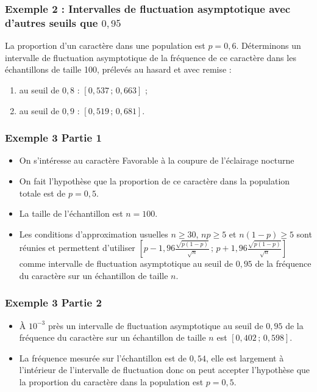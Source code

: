 \documentclass[xcolor=svgnames,t,final]{beamer}
\newcommand{\Interff}[2]{\left[#1\, ;\, #2\right]}
\begin{document}
\begin{frame}

\frametitle{Exemple 2 : Intervalles de fluctuation  asymptotique avec d'autres seuils que $0,95$}

La proportion d'un caractère dans une population  est $p=0,6$. Déterminons un intervalle de fluctuation asymptotique  de la fréquence de ce caractère dans les échantillons de taille 100, prélevés au hasard et avec remise :

\begin{enumerate}
\item au seuil de  $0,8$ : $\boxed{\Interff{0,537}{0,663}}$  ;
\item au seuil de  $0,9$ :  $\boxed{\Interff{0,519}{0,681}}$.
\end{enumerate}

\end{frame}


\begin{frame}
\frametitle{Exemple 3 Partie 1}

\label{exemple3} 

\begin{itemize}
\pause \item On s'intéresse au caractère \og{} Favorable à la coupure de l'éclairage nocturne \fg{} 
\pause \item On fait l'hypothèse que la proportion de ce caractère dans la population totale est de $p=0,5$.
\pause \item La taille de l'échantillon est $n=100$.
\pause \item Les conditions d'approximation usuelles $n \geqslant 30$, $np \geqslant 5$ et $n(1-p) \geqslant 5$ sont réunies et permettent d'utiliser $
\Interff{p-1,96\frac{\sqrt{p(1-p)}}{\sqrt{n}}}{p+1,96\frac{\sqrt{p(1-p)}}{\sqrt{n}}}$  comme intervalle de fluctuation asymptotique au seuil de $0,95$ de la fréquence  du caractère sur un échantillon de taille $n$.

\end{itemize}

\end{frame}




\begin{frame}
\frametitle{Exemple 3 Partie 2}



\begin{itemize}
\pause \item À $10^{-3}$ près un intervalle de fluctuation  asymptotique au seuil de $0,95$ de la fréquence  du caractère sur un échantillon de taille $n$ est $\Interff{0,402}{0,598}$.

\pause \item La fréquence mesurée sur l'échantillon est de $0,54$, elle est largement à l'intérieur de l'intervalle de fluctuation donc on peut accepter l'hypothèse que la proportion du caractère dans la population est $p=0,5$.

\end{itemize}

\end{frame}
\end{document}

